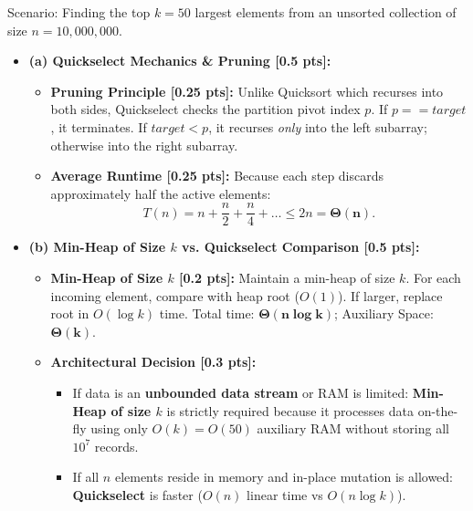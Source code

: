 \documentclass[11pt,a4paper]{article}
\begin{document}
\vspace{0.4em}

\begin{solutionbox}
Scenario: Finding the top $k = 50$ largest elements from an unsorted collection of size $n = 10,000,000$.
\begin{itemize}
    \item \textbf{(a) Quickselect Mechanics \& Pruning [0.5 pts]:}
    \begin{itemize}
        \item \textbf{Pruning Principle [0.25 pts]:} Unlike Quicksort which recurses into both sides, Quickselect checks the partition pivot index $p$. If $p == target$, it terminates. If $target < p$, it recurses \textit{only} into the left subarray; otherwise into the right subarray.
        \item \textbf{Average Runtime [0.25 pts]:} Because each step discards approximately half the active elements:
        \[
        T(n) = n + \frac{n}{2} + \frac{n}{4} + \dots \le 2n = \mathbf{\Theta(n)}.
        \]
    \end{itemize}
    \item \textbf{(b) Min-Heap of Size $k$ vs. Quickselect Comparison [0.5 pts]:}
    \begin{itemize}
        \item \textbf{Min-Heap of Size $k$ [0.2 pts]:} Maintain a min-heap of size $k$. For each incoming element, compare with heap root ($O(1)$). If larger, replace root in $O(\log k)$ time. Total time: $\mathbf{\Theta(n \log k)}$; Auxiliary Space: $\mathbf{\Theta(k)}$.
        \item \textbf{Architectural Decision [0.3 pts]:}
        \begin{itemize}
            \item If data is an \textbf{unbounded data stream} or RAM is limited: \textbf{Min-Heap of size $k$} is strictly required because it processes data on-the-fly using only $O(k) = O(50)$ auxiliary RAM without storing all $10^7$ records.
            \item If all $n$ elements reside in memory and in-place mutation is allowed: \textbf{Quickselect} is faster ($O(n)$ linear time vs $O(n \log k)$).
        \end{itemize}
    \end{itemize}
\end{itemize}
\end{solutionbox}
\end{document}
